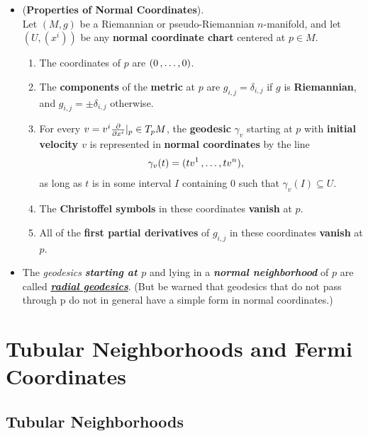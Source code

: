\documentclass[11pt]{article}
\begin{document}
\begin{itemize}
\item \begin{proposition} (\textbf{Properties of Normal Coordinates}). \citep{lee2018introduction} \\
Let $(M, g)$ be a Riemannian or pseudo-Riemannian $n$-manifold, and let $(U, (x^i))$ be any \textbf{normal coordinate chart} centered at $p \in M$.
\begin{enumerate}
\item The coordinates of $p$ are $(0 \,{,}\ldots{,}\, 0)$.
\item The \textbf{components} of the \textbf{metric} at $p$ are $g_{i,j} = \delta_{i,j}$ if $g$ is \textbf{Riemannian}, and $g_{i,j} = \pm \delta_{i,j}$ otherwise.
\item For every $v = v^i \frac{\partial }{ \partial x^i}|_{p} \in T_{p}M$, the \textbf{geodesic} $\gamma_v$ starting at $p$ with \textbf{initial velocity $v$} is represented in \textbf{normal coordinates} by the line
\begin{align}
\gamma_{v}(t) &= (tv^1 \,{,}\ldots{,}\, tv^n), \label{eqn: normal_coordinate_geodesic}
\end{align} as long as $t$ is in some interval $I$ containing $0$ such that $\gamma_v(I) \subseteq U$.
\item The \textbf{Christoffel symbols} in these coordinates \textbf{vanish} at $p$.
\item All of the \textbf{first partial derivatives} of $g_{i,j}$ in these coordinates \textbf{vanish} at $p$.
\end{enumerate}
\end{proposition}

\item \begin{remark}
The \emph{geodesics} \emph{\textbf{starting at $p$}} and lying in a \emph{\textbf{normal neighborhood}} of $p$ are called \underline{\emph{\textbf{radial geodesics}}}. (But be warned that geodesics that do not pass through p do not in general have a simple form in normal coordinates.)
\end{remark}
\end{itemize}

\section{Tubular Neighborhoods and Fermi Coordinates}
\subsection{Tubular Neighborhoods}
\end{document}

